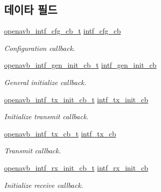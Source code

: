 \subsection*{데이타 필드}
\begin{DoxyCompactItemize}
\item 
\hyperlink{include_2openavb__intf__pub_8h_af371166706407f2ded7a0e04e75338b2}{openavb\+\_\+intf\+\_\+cfg\+\_\+cb\+\_\+t} \hyperlink{structopenavb__intf__cb__t_ac399da5e32ebb5e311f3c2fefc7c53e2}{intf\+\_\+cfg\+\_\+cb}
\begin{DoxyCompactList}\small\item\em Configuration callback. \end{DoxyCompactList}\item 
\hyperlink{include_2openavb__intf__pub_8h_a36655b6ca2e1cb054ae706e96f5ec0bb}{openavb\+\_\+intf\+\_\+gen\+\_\+init\+\_\+cb\+\_\+t} \hyperlink{structopenavb__intf__cb__t_abdfcb6b35075220160046e97e8c51b34}{intf\+\_\+gen\+\_\+init\+\_\+cb}
\begin{DoxyCompactList}\small\item\em General initialize callback. \end{DoxyCompactList}\item 
\hyperlink{include_2openavb__intf__pub_8h_a6ca505d3ba005197893b08db56468b60}{openavb\+\_\+intf\+\_\+tx\+\_\+init\+\_\+cb\+\_\+t} \hyperlink{structopenavb__intf__cb__t_a8c4365e897d7567f363435819ed2c795}{intf\+\_\+tx\+\_\+init\+\_\+cb}
\begin{DoxyCompactList}\small\item\em Initialize transmit callback. \end{DoxyCompactList}\item 
\hyperlink{include_2openavb__intf__pub_8h_a78ef93a9795ccc0d9626575912b4ee79}{openavb\+\_\+intf\+\_\+tx\+\_\+cb\+\_\+t} \hyperlink{structopenavb__intf__cb__t_a697ca0e024c5d38ae52fba581741c255}{intf\+\_\+tx\+\_\+cb}
\begin{DoxyCompactList}\small\item\em Transmit callback. \end{DoxyCompactList}\item 
\hyperlink{include_2openavb__intf__pub_8h_af1daca241f507dd960c9c8756c25e203}{openavb\+\_\+intf\+\_\+rx\+\_\+init\+\_\+cb\+\_\+t} \hyperlink{structopenavb__intf__cb__t_a9657b542d4ff314437568bd9566d7519}{intf\+\_\+rx\+\_\+init\+\_\+cb}
\begin{DoxyCompactList}\small\item\em Initialize receive callback. \end{DoxyCompactList}\item 

\end{DoxyCompactItemize}
